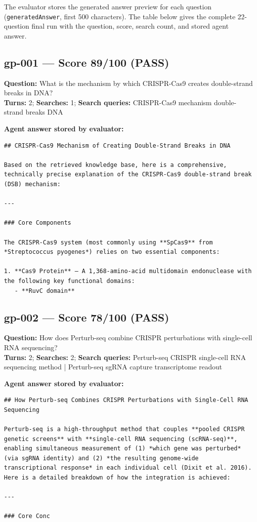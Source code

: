 \documentclass[12pt, a4paper]{article}
\begin{document}
\noindent The evaluator stores the generated answer preview for each question
(\texttt{generatedAnswer}, first 500 characters). The table below gives the complete
22-question final run with the question, score, search count, and stored agent answer.

\subsection*{gp-001 --- Score 89/100 (PASS)}
\noindent\textbf{Question:} What is the mechanism by which CRISPR-Cas9 creates double-strand breaks in DNA?\\
\textbf{Turns:} 2; \textbf{Searches:} 1; \textbf{Search queries:} CRISPR-Cas9 mechanism double-strand breaks DNA

\noindent\textbf{Agent answer stored by evaluator:}
\begin{lstlisting}[numbers=none]
## CRISPR-Cas9 Mechanism of Creating Double-Strand Breaks in DNA

Based on the retrieved knowledge base, here is a comprehensive, technically precise explanation of the CRISPR-Cas9 double-strand break (DSB) mechanism:

---

### Core Components

The CRISPR-Cas9 system (most commonly using **SpCas9** from *Streptococcus pyogenes*) relies on two essential components:

1. **Cas9 Protein** — A 1,368-amino-acid multidomain endonuclease with the following key functional domains:
   - **RuvC domain**
\end{lstlisting}

\subsection*{gp-002 --- Score 78/100 (PASS)}
\noindent\textbf{Question:} How does Perturb-seq combine CRISPR perturbations with single-cell RNA sequencing?\\
\textbf{Turns:} 2; \textbf{Searches:} 2; \textbf{Search queries:} Perturb-seq CRISPR single-cell RNA sequencing method | Perturb-seq sgRNA capture transcriptome readout

\noindent\textbf{Agent answer stored by evaluator:}
\begin{lstlisting}[numbers=none]
## How Perturb-seq Combines CRISPR Perturbations with Single-Cell RNA Sequencing

Perturb-seq is a high-throughput method that couples **pooled CRISPR genetic screens** with **single-cell RNA sequencing (scRNA-seq)**, enabling simultaneous measurement of (1) *which gene was perturbed* (via sgRNA identity) and (2) *the resulting genome-wide transcriptional response* in each individual cell (Dixit et al. 2016). Here is a detailed breakdown of how the integration is achieved:

---

### Core Conc
\end{lstlisting}
\end{document}
